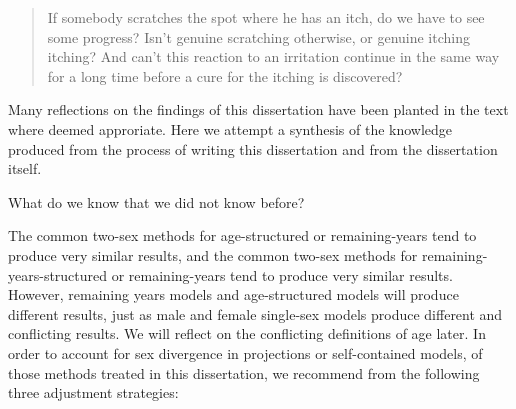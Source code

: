 \FloatBarrier
\label{sec:reflections}


\begin{singlespace}
\begin{quote}
 If somebody scratches the spot where he has an itch, do we have to see 
 some progress? Isn't genuine scratching otherwise, or genuine itching 
itching? And can't this reaction to an irritation continue in the 
same way for a long time before a cure for the itching is discovered?
\citep{wittgenstein1984culture}
\end{quote}
\end{singlespace}

Many reflections on the findings of this dissertation have been planted in the
text where deemed approriate. Here we attempt a synthesis of the
knowledge produced from the process of writing this dissertation and from the
dissertation itself.

What do we know that we did not know before?

The common two-sex methods for age-structured or remaining-years tend to produce
very similar results, and the common two-sex methods for
remaining-years-structured or remaining-years tend to produce very similar
results. However, remaining years models and age-structured models will
produce different results, just as male and female single-sex models produce
different and conflicting results. We will reflect on the conflicting
definitions of age later. In order to account for sex divergence in
projections or self-contained models, of those methods treated in
this dissertation, we recommend from the following three adjustment strategies:

